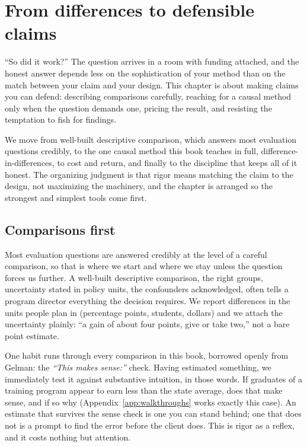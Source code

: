 \documentclass[
    a4paper,
    fontsize=10pt,
    twoside=true,
    numbers=noenddot,
]{kaobook}
\begin{document}
\chapter{From differences to defensible claims}\label{ch:claims}

\enquote{So did it work?} The question arrives in a room with funding attached, and the honest answer depends less on the sophistication of your method than on the match between your claim and your design. This chapter is about making claims you can defend: describing comparisons carefully, reaching for a causal method only when the question demands one, pricing the result, and resisting the temptation to fish for findings.

We move from well-built descriptive comparison, which answers most evaluation questions credibly, to the one causal method this book teaches in full, difference-in-differences, to cost and return, and finally to the discipline that keeps all of it honest. The organizing judgment is that rigor means matching the claim to the design, not maximizing the machinery, and the chapter is arranged so the strongest and simplest tools come first.

\section{Comparisons first}\label{sec:comparisons}
Most evaluation questions are answered credibly at the level of a careful comparison, so that is where we start and where we stay unless the question forces us further. A well-built descriptive comparison, the right groups, uncertainty stated in policy units, the confounders acknowledged, often tells a program director everything the decision requires. We report differences in the units people plan in (percentage points, students, dollars) and we attach the uncertainty plainly: \enquote{a gain of about four points, give or take two,} not a bare point estimate.

One habit runs through every comparison in this book, borrowed openly from Gelman: the \emph{\enquote{This makes sense:}} check. Having estimated something, we immediately test it against substantive intuition, in those words. If graduates of a training program appear to earn less than the state average, does that make sense, and if so why (Appendix~\ref{app:walkthroughs} works exactly this case). An estimate that survives the sense check is one you can stand behind; one that does not is a prompt to find the error before the client does. This is rigor as a reflex, and it costs nothing but attention.
\end{document}
